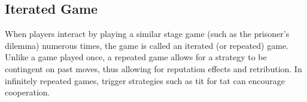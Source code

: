 \documentclass[]{report}
\begin{document}
\subsection{Iterated Game}
When players interact by playing a similar stage game (such as the prisoner's dilemma) numerous times, the game is called an iterated (or repeated) game. Unlike a game played once, a repeated game allows for a strategy to be contingent on past moves, thus allowing for reputation effects and retribution. In infinitely repeated games, trigger strategies such as tit for tat can encourage cooperation.
\end{document}
